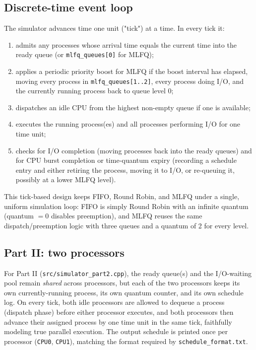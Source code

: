 \documentclass[11pt]{article}
\begin{document}
\subsection{Discrete-time event loop}
The simulator advances time one unit ("tick") at a time. In every tick it:
\begin{enumerate}[nosep]
  \item admits any processes whose arrival time equals the current time
        into the ready queue (or \texttt{mlfq\_queues[0]} for MLFQ);
  \item applies a periodic priority boost for MLFQ if the boost interval has
        elapsed, moving every process in \texttt{mlfq\_queues[1..2]}, every
        process doing I/O, and the currently running process back to queue
        level 0;
  \item dispatches an idle CPU from the highest non-empty queue if one is
        available;
  \item executes the running process(es) and all processes performing I/O
        for one time unit;
  \item checks for I/O completion (moving processes back into the ready
        queues) and for CPU burst completion or time-quantum expiry
        (recording a schedule entry and either retiring the process,
        moving it to I/O, or re-queuing it, possibly at a lower MLFQ
        level).
\end{enumerate}
This tick-based design keeps FIFO, Round Robin, and MLFQ under a single,
uniform simulation loop: FIFO is simply Round Robin with an infinite
quantum (quantum $=0$ disables preemption), and MLFQ reuses the same
dispatch/preemption logic with three queues and a quantum of 2 for every
level.

\subsection{Part II: two processors}
For Part II (\texttt{src/simulator\_part2.cpp}), the ready queue(s) and the
I/O-waiting pool remain \emph{shared} across processors, but each of the two
processors keeps its own currently-running process, its own quantum
counter, and its own schedule log. On every tick, both idle processors are
allowed to dequeue a process (dispatch phase) before either processor
executes, and both processors then advance their assigned process by one
time unit in the same tick, faithfully modeling true parallel execution.
The output schedule is printed once per processor (\texttt{CPU0},
\texttt{CPU1}), matching the format required by
\texttt{schedule\_format.txt}.
\end{document}
